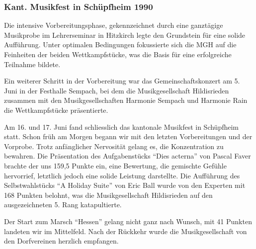 \begin{history}
    \subsubsection*{Kant. Musikfest in Schüpfheim 1990}

    Die intensive Vorbereitungsphase, gekennzeichnet durch eine ganztägige
    Musikprobe im Lehrerseminar in Hitzkirch legte den Grundstein für eine
    solide Aufführung. Unter optimalen Bedingungen fokussierte sich die MGH auf
    die Feinheiten der beiden Wettkampfstücke, was die Basis für eine
    erfolgreiche Teilnahme bildete.

    Ein weiterer Schritt in der Vorbereitung war das Gemeinschaftskonzert am 5.
    Juni in der Festhalle Sempach, bei dem die Musikgesellschaft Hildisrieden
    zusammen mit den Musikgesellschaften Harmonie Sempach und Harmonie Rain die
    Wettkampfstücke präsentierte.

    Am 16. und 17. Juni fand schliesslich das kantonale Musikfest in Schüpfheim
    statt. Schon früh am Morgen begann wir mit den letzten Vorbereitungen und
    der Vorprobe. Trotz anfänglicher Nervosität gelang es, die Konzentration zu
    bewahren. Die Präsentation des Aufgabenstücks \enquote{Dies acterna} von
    Pascal Faver brachte der uns 159,5 Punkte ein, eine Bewertung, die gemischte
    Gefühle hervorrief, letztlich jedoch eine solide Leistung darstellte. Die
    Aufführung des Selbstwahlstücks \enquote{A Holiday Suite} von Eric Ball
    wurde von den Experten mit 168 Punkten belohnt, was die Musikgesellschaft
    Hildisrieden auf den ausgezeichneten 5. Rang katapultierte.

    Der Start zum Marsch \enquote{Hessen} gelang nicht ganz nach Wunsch, mit 41
    Punkten landeten wir im Mittelfeld. Nach der Rückkehr wurde die
    Musikgesellschaft von den Dorfvereinen herzlich empfangen.

\end{history}
\clearpage
